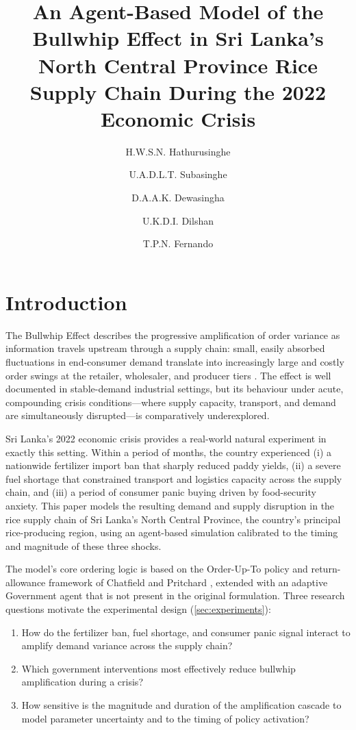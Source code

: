 \documentclass[final,onefignum,onetabnum]{siuro250211}
\title{An Agent-Based Model of the Bullwhip Effect in Sri Lanka's
North Central Province Rice Supply Chain During the 2022 Economic Crisis}
\author{H.W.S.N. Hathurusinghe
\and U.A.D.L.T. Subasinghe
\and D.A.A.K. Dewasingha
\and U.K.D.I. Dilshan
\and T.P.N. Fernando}
\begin{document}
\maketitle

\section{Introduction}
\label{sec:intro}

The Bullwhip Effect describes the progressive amplification of order variance as information
travels upstream through a supply chain: small, easily absorbed fluctuations in end-consumer
demand translate into increasingly large and costly order swings at the retailer, wholesaler, and
producer tiers \cite{LeePadmanabhanWhang1997}. The effect is well documented in stable-demand
industrial settings, but its behaviour under acute, compounding crisis conditions---where supply
capacity, transport, and demand are simultaneously disrupted---is comparatively underexplored.

Sri Lanka's 2022 economic crisis provides a real-world natural experiment in exactly this
setting. Within a period of months, the country experienced (i) a nationwide fertilizer import
ban that sharply reduced paddy yields, (ii) a severe fuel shortage that constrained transport and
logistics capacity across the supply chain, and (iii) a period of consumer panic buying driven by
food-security anxiety. This paper models the resulting demand and supply disruption in the rice
supply chain of Sri Lanka's North Central Province, the country's principal rice-producing
region, using an agent-based simulation calibrated to the timing and magnitude of these three
shocks.

The model's core ordering logic is based on the Order-Up-To policy and return-allowance
framework of Chatfield and Pritchard \cite{ChatfieldPritchard2013}, extended with an adaptive
Government agent that is not present in the original formulation. Three research questions
motivate the experimental design (\cref{sec:experiments}):

\begin{enumerate}
\item How do the fertilizer ban, fuel shortage, and consumer panic signal interact to amplify
demand variance across the supply chain?
\item Which government interventions most effectively reduce bullwhip amplification during a
crisis?
\item How sensitive is the magnitude and duration of the amplification cascade to model
parameter uncertainty and to the timing of policy activation?
\end{enumerate}
\end{document}
